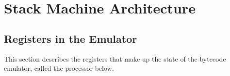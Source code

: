 %
%
%


\chapter{Stack Machine Architecture}


\section{Registers in the Emulator}

This section describes the registers that make up the state of the
bytecode emulator, called the processor below.

